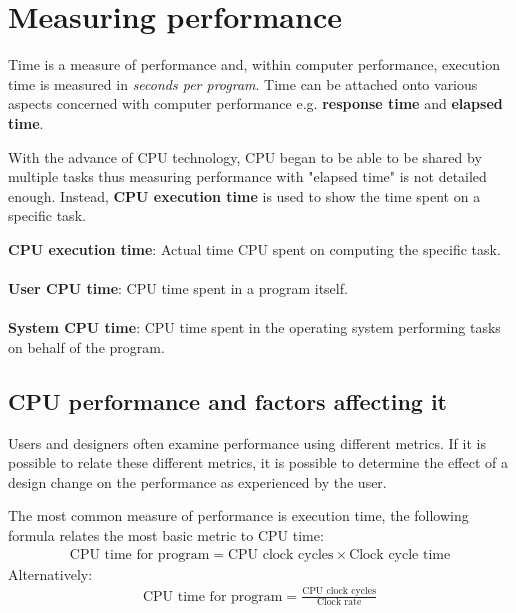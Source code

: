 \documentclass[10pt,a4paper]{article}
\begin{document}
\section{Measuring performance}

Time is a measure of performance and, within computer performance, execution time is measured in
\textit{seconds per program}. Time can be attached onto various aspects concerned with computer
performance e.g. \textbf{response time} and \textbf{elapsed time}.

With the advance of CPU technology, CPU began to be able to be shared by multiple tasks thus
measuring performance with "elapsed time" is not detailed enough. Instead, \textbf{CPU execution
time} is used to show the time spent on a specific task.

\begin{tcolorbox}[breakable,colback=white]
\textbf{CPU execution time}: Actual time CPU spent on computing the specific task.
\\
\\
\textbf{User CPU time}: CPU time spent in a program itself.
\\
\\
\textbf{System CPU time}: CPU time spent in the operating system performing tasks on behalf of the program.
\end{tcolorbox}

\pagebreak

\subsection{CPU performance and factors affecting it}

Users and designers often examine performance using different metrics. If it is possible to relate
these different metrics, it is possible to determine the effect of a design change on the
performance as experienced by the user.

The most common measure of performance is execution time, the following formula relates the most
basic metric to CPU time:
\begin{align*}
    \text{CPU time for program} = \text{CPU clock cycles} \times \text{Clock cycle time}
\end{align*}
Alternatively:
\begin{align*}
    \text{CPU time for program} = \frac{\text{CPU clock cycles}}{\text{Clock rate}}
\end{align*}
\end{document}
